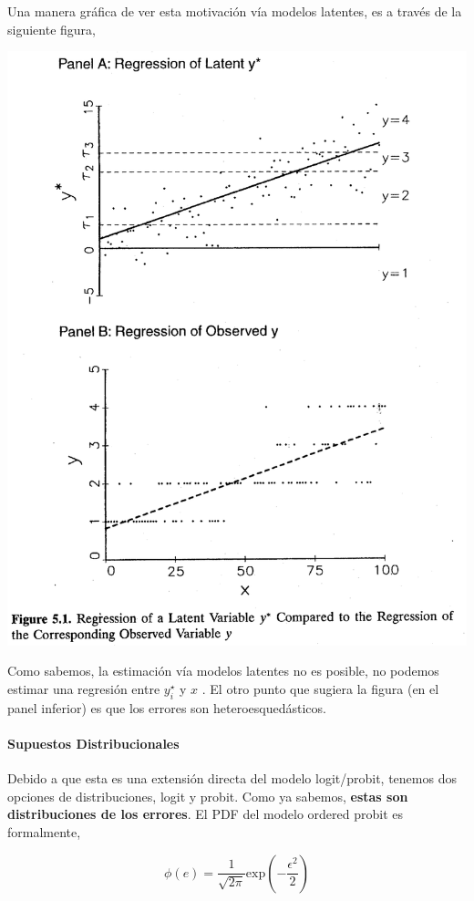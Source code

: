 \documentclass[onesided]{article}\usepackage[]{graphicx}\usepackage[]{color}
\makeatletter
\def\maxwidth{ %
  \ifdim\Gin@nat@width>\linewidth
    \linewidth
  \else
    \Gin@nat@width
  \fi
}
\makeatother
\begin{document}
Una manera gr\'afica de ver esta motivaci\'on v\'ia modelos latentes, es a trav\'es de la siguiente figura,

{\centering \includegraphics[width=\maxwidth]{latente_observed.png}}

Como sabemos, la estimaci\'on v\'ia modelos latentes no es posible, no podemos estimar una regresi\'on entre $y_{i}^{\star}$ y $x$ \parencite[117]{Long:1997wv}. El otro punto que sugiera la figura (en el panel inferior) es que los errores son heteroesqued\'asticos. 

\paragraph{Supuestos Distribucionales} Debido a que esta es una extensi\'on directa del modelo logit/probit, tenemos dos opciones de distribuciones, logit y probit. Como ya sabemos, {\bf estas son distribuciones de los errores}. El PDF del modelo ordered probit es formalmente,


\begin{equation}%
\phi(e) = \frac{1}{\sqrt{2\pi}}\text{exp}(-\frac{\epsilon^{2}}{2})
\end{equation}
\end{document}

